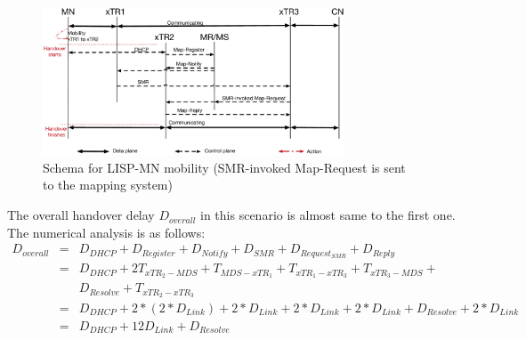 \begin{figure}[!th]
	\centering
	\includegraphics[width=0.8\textwidth]{Pics/Mobility_xTR_schema_SMR_simplify}
	\caption{Schema for LISP-MN mobility (SMR-invoked Map-Request is sent to the mapping system)}
	\label{sim_schema_xTR}
\end{figure}

The overall handover delay $D_{overall}$ in this scenario is almost same to the first one. The numerical analysis is as follows:
\begin{eqnarray}
D_{overall} &=& D_{DHCP} + D_{Register} + D_{Notify} + D_{SMR} + D_{Request_{SMR}} + D_{Reply} \nonumber \\
&=& D_{DHCP} + 2T_{xTR_2-MDS} + T_{MDS-xTR_1} + T_{xTR_1-xTR_3} + T_{xTR_3-MDS} + \nonumber \\
& & D_{Resolve} + T_{xTR_2-xTR_3} \nonumber \\
&=& D_{DHCP} +2* (2*D_{Link}) + 2*D_{Link} + 2*D_{Link} + 2*D_{Link} + D_{Resolve} + 2*D_{Link} \nonumber \\
&=& D_{DHCP} + 12D_{Link} + D_{Resolve} 
\end{eqnarray}

